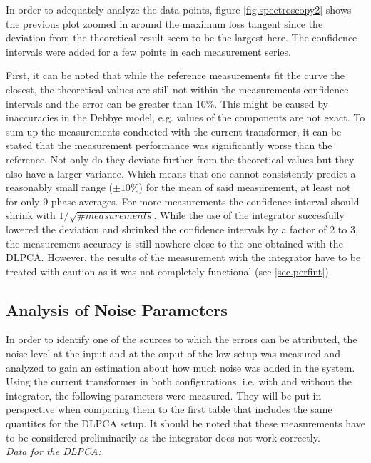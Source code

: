 In order to adequately analyze the data points, figure \ref{fig.spectroscopy2} shows the previous plot
zoomed in around the maximum loss tangent since the deviation from the theoretical result seem to be the largest here.
The confidence intervals were added for a few points in each measurement series.

First, it can be noted that while the reference measurements fit the curve the closest, the theoretical values are still not
within the measurements confidence intervals and the error can be greater than 10\%. This might be caused by inaccuracies in the Debbye model, e.g. values of the components are not exact. To sum up the measurements conducted with
the current transformer, it can be stated that the measurement performance was significantly worse than the reference. Not only do they deviate further from the theoretical values
but they also have a larger variance. Which means that one cannot consistently predict a reasonably small range ($\pm 10 \%$) for the mean of said measurement, at least not for only 9 phase averages. For more measurements the confidence interval should shrink with $1/\sqrt{\# measurements}$. 
While the use of the integrator succesfully lowered the deviation and shrinked the confidence intervals by a factor of 2 to 3, the measurement accuracy is still nowhere close to the one obtained with the DLPCA. However, the results of the measurement with the integrator have to be treated with caution as it was not completely functional (see \ref{sec.perfint}). 

\subsection{Analysis of Noise Parameters}

In order to identify one of the sources to which the errors can be attributed, the noise level at the input and at the ouput of the low-setup was measured and analyzed to gain an estimation about how much noise was added in the system.
Using the current transformer in both configurations, i.e. with and without the integrator, the following parameters were measured. They will be put in perspective when comparing them to the first table that includes the same quantites for the DLPCA setup. It should be noted that these measurements have to be considered preliminarily as the integrator does not work correctly. \\


\textit{Data for the DLPCA:}


